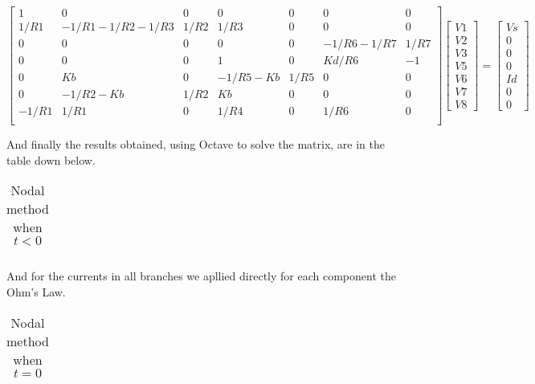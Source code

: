 $$
\begin{bmatrix} 
   1     & 0               & 0    & 0           & 0    & 0          & 0    \\
   1/R1  & -1/R1-1/R2-1/R3 & 1/R2 & 1/R3        & 0    & 0          & 0    \\
   0     & 0               & 0    & 0           & 0    & -1/R6-1/R7 & 1/R7 \\
   0     & 0               & 0    & 1           & 0    & Kd/R6      & -1   \\
   0     & Kb              & 0    & -1/R5-Kb    & 1/R5 & 0          & 0    \\
   0     & -1/R2-Kb        & 1/R2 & Kb          & 0    & 0          & 0    \\
   -1/R1 & 1/R1            & 0    & 1/R4        & 0    & 1/R6       & 0    \\
\end {bmatrix} 
\begin{bmatrix}
V1 \\ V2 \\ V3 \\ V5 \\ V6 \\ V7 \\ V8
\end {bmatrix} 
=
\begin{bmatrix} 
Vs \\ 0 \\ 0 \\ 0 \\ Id \\ 0 \\ 0
\end {bmatrix} 
$$ 


\vspace{0.5cm}
And finally the results obtained, using Octave to solve the matrix, are in the table down below. 


\FloatBarrier
\begin{table}[h]
  \centering
  \begin{tabular}{|c|c|c|c|c|c|c|}
    \hline    
    
    \hline
  \end{tabular}
  \caption{Nodal method when $t<0$}
  \label{tab:nodal}
\end{table}
\FloatBarrier 

And for the currents in all branches we apllied directly for each component the Ohm's Law. 

\FloatBarrier
\begin{table}[h]
  \centering
  \begin{tabular}{|c|c|c|c|c|c|c|}
    \hline    
    
    \hline
  \end{tabular}
  \caption{Nodal method when $t=0$}
  \label{tab:nodal}
\end{table}
\FloatBarrier 


